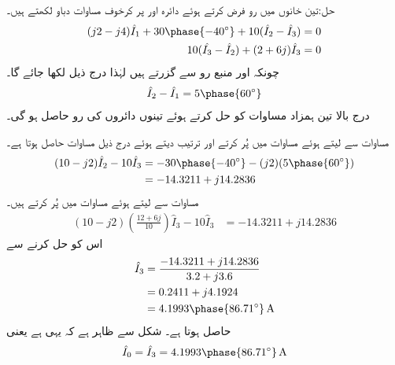 حل:تین خانوں میں رو فرض کرتے ہوئے دائرہ  اور  پر  کرخوف مساوات دباو لکھتے ہیں۔
\begin{align}
(j2-j4)\hat{I}_1+30\phase{-40^{\circ}}+10(\hat{I}_2-\hat{I}_3)&=0 \label{مساوات_بدلتا_دائری_ترکیب_الف}\\
10(\hat{I_3}-\hat{I}_2)+(2+6j)\hat{I}_3&=0  \label{مساوات_بدلتا_دائری_ترکیب_ب}
\end{align} 
چونکہ  اور  منبع رو سے گزرتے ہیں لہٰذا درج ذیل لکھا جائے گا۔
\begin{align}
\hat{I}_2-\hat{I}_1=5\phase{60^{\circ}}  \label{مساوات_بدلتا_دائری_ترکیب_پ}
\end{align}
درج بالا تین ہمزاد مساوات کو حل کرتے ہوئے تینوں دائروں کی رو حاصل ہو گی۔

مساوات  سے  لیتے ہوئے مساوات  میں پُر کرتے اور ترتیب دیتے ہوئے درج ذیل مساوات حاصل ہوتا ہے۔
\begin{gather}
\begin{aligned} \label{مساوات_بدلتا_دائری_ترکیب_ت}
(10-j2)\hat{I}_2-10\hat{I}_3&=-30\phase{-40^{\circ}}-(j2)(5\phase{60^{\circ}})\\
&=-14.3211+j14.2836
\end{aligned}
\end{gather}
مساوات  سے  لیتے ہوئے مساوات  میں پُر کرتے ہیں۔
\begin{align*}
(10-j2)\left(\frac{12+6j}{10}\right)\hat{I}_3-10\hat{I}_3&=-14.3211+j14.2836
\end{align*}
اس کو حل کرنے سے
\begin{align*}
\hat{I}_3&=\frac{-14.3211+j14.2836}{3.2+j3.6}\\
&=0.2411+j4.1924\\
&=4.1993\phase{86.71^{\circ}}\,\si{\ampere}
\end{align*}
حاصل ہوتا ہے۔ شکل سے ظاہر ہے کہ یہی  ہے یعنی
\begin{align}
\hat{I}_0=\hat{I}_3=4.1993\phase{86.71^{\circ}}\,\si{\ampere}
\end{align}

